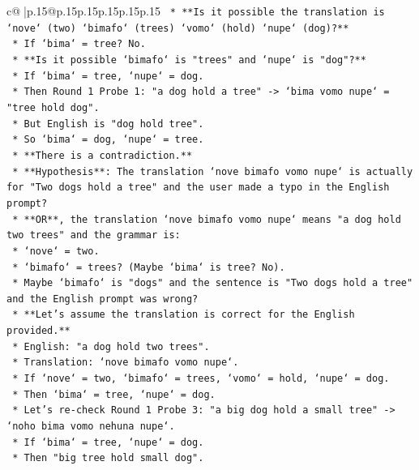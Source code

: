 \documentclass{article}
\begin{document}
{\begin{supertabular}{c@{$\;$}|p{.15\linewidth}@{}p{.15\linewidth}p{.15\linewidth}p{.15\linewidth}p{.15\linewidth}p{.15\linewidth}}
{{{\texttt{            *   **Is it possible the translation is `nove` (two) `bimafo` (trees) `vomo` (hold) `nupe` (dog)?**} \\
\texttt{            *   If `bima` = tree? No.} \\
\texttt{            *   **Is it possible `bimafo` is "trees" and `nupe` is "dog"?**} \\
\texttt{            *   If `bima` = tree, `nupe` = dog.} \\
\texttt{            *   Then Round 1 Probe 1: "a dog hold a tree" {-}> `bima vomo nupe` = "tree hold dog".} \\
\texttt{            *   But English is "dog hold tree".} \\
\texttt{            *   So `bima` = dog, `nupe` = tree.} \\
\texttt{            *   **There is a contradiction.**} \\
\texttt{            *   **Hypothesis**: The translation `nove bimafo vomo nupe` is actually for "Two dogs hold a tree" and the user made a typo in the English prompt?} \\
\texttt{            *   **OR**, the translation `nove bimafo vomo nupe` means "a dog hold two trees" and the grammar is:} \\
\texttt{                *   `nove` = two.} \\
\texttt{                *   `bimafo` = trees? (Maybe `bima` is tree? No).} \\
\texttt{                *   Maybe `bimafo` is "dogs" and the sentence is "Two dogs hold a tree" and the English prompt was wrong?} \\
\texttt{            *   **Let's assume the translation is correct for the English provided.**} \\
\texttt{            *   English: "a dog hold two trees".} \\
\texttt{            *   Translation: `nove bimafo vomo nupe`.} \\
\texttt{            *   If `nove` = two, `bimafo` = trees, `vomo` = hold, `nupe` = dog.} \\
\texttt{            *   Then `bima` = tree, `nupe` = dog.} \\
\texttt{            *   Let's re{-}check Round 1 Probe 3: "a big dog hold a small tree" {-}> `noho bima vomo nehuna nupe`.} \\
\texttt{            *   If `bima` = tree, `nupe` = dog.} \\
\texttt{            *   Then "big tree hold small dog".} \\
}}}
\end{supertabular}}
\end{document}

